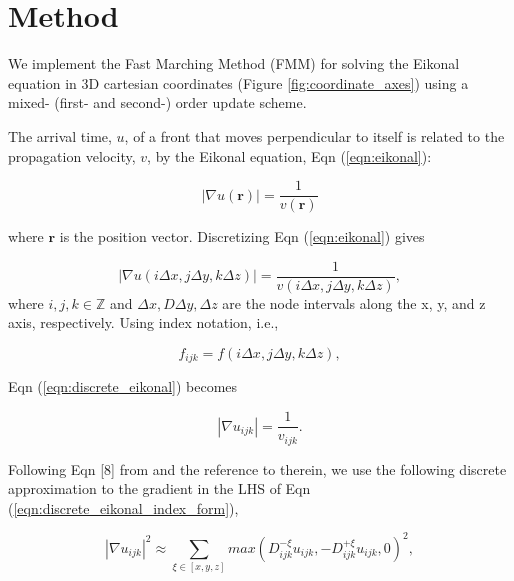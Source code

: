 \section{Method}
	We implement the Fast Marching Method (FMM) for solving the Eikonal equation in 3D cartesian coordinates (Figure \ref{fig:coordinate_axes}) using a mixed- (first- and second-) order update scheme.
	\par
	
	

	The arrival time, $u$, of a front that moves perpendicular to itself is related to the propagation velocity, $v$, by the Eikonal equation, Eqn (\ref{eqn:eikonal}):
	
	\begin{equation}
		\label{eqn:eikonal}
		\left|\nabla u\left(\mathbf{r}\right)\right| = \frac{1}{v\left(\mathbf{r}\right)}
	\end{equation}
	
	\noindent where $\mathbf{r}$ is the position vector. Discretizing Eqn (\ref{eqn:eikonal}) gives
	
	\begin{equation}
		\label{eqn:discrete_eikonal}
		\left|\nabla u\left(i\Delta x, j\Delta y, k\Delta z\right)\right| = \frac{1}{v\left(i\Delta x, j\Delta y, k\Delta z\right)},
	\end{equation}
	\noindent	where $i, j, k \in \mathbb{Z}$ and $\Delta x, D\Delta y, \Delta z$ are the node intervals along the x, y, and z axis, respectively. Using index notation, i.e.,
	
	\begin{equation}
		f_{ijk} = f\left(i\Delta x, j\Delta y, k\Delta z\right),
	\end{equation}
	
	\noindent Eqn (\ref{eqn:discrete_eikonal}) becomes
	
	\begin{equation}
		\label{eqn:discrete_eikonal_index_form}
			\left|\nabla u_{ijk}\right| = \frac{1}{v_{ijk}}.
	\end{equation}
	
	Following Eqn [8] from  and the reference to  therein, we use the following discrete approximation to the gradient in the LHS of Eqn (\ref{eqn:discrete_eikonal_index_form}),
	
	\begin{equation}
		\left|\nabla u_{ijk}\right| ^2 \approx 
		\sum_{\xi \in \left[x, y, z\right]} max\left(D^{-\xi}_{ijk}u_{ijk}, -D^{+\xi}_{ijk}u_{ijk}, 0 \right)^2,
	\end{equation}
	
